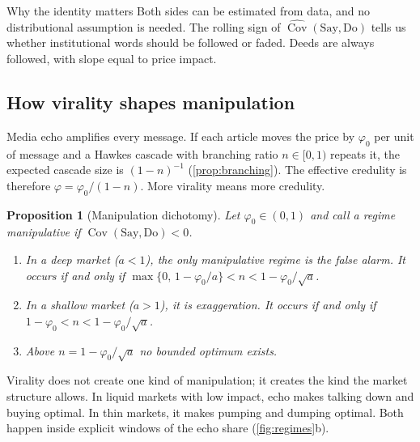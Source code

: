 \documentclass[11pt,a4paper]{article}
\theoremstyle{sci}
\newtheorem{proposition}[theorem]{Proposition}
\theoremstyle{scidef}
\DeclareMathOperator{\Cov}{Cov}
\begin{document}
\begin{keybox}{Why the identity matters}
Both sides can be estimated from data, and no distributional assumption is needed. The rolling sign of $\widehat{\Cov}(\text{Say},\text{Do})$ tells us whether institutional words should be followed or faded. Deeds are always followed, with slope equal to price impact.
\end{keybox}

\subsection{How virality shapes manipulation}

Media echo amplifies every message. If each article moves the price by $\varphi_0$ per unit of message and a Hawkes cascade with branching ratio $n\in[0,1)$ repeats it, the expected cascade size is $(1-n)^{-1}$ (\cref{prop:branching}). The effective credulity is therefore $\varphi=\varphi_0/(1-n)$. More virality means more credulity.

\begin{proposition}[Manipulation dichotomy]\label{prop:virality}
Let $\varphi_0\in(0,1)$ and call a regime \emph{manipulative} if $\Cov(\text{Say},\text{Do})<0$.
\begin{enumerate}[label=(\roman*)]
  \item In a \emph{deep} market ($a<1$), the only manipulative regime is the false alarm. It occurs if and only if $\max\{0,\,1-\varphi_0/a\}<n<1-\varphi_0/\sqrt a$.
  \item In a \emph{shallow} market ($a>1$), it is exaggeration. It occurs if and only if $1-\varphi_0<n<1-\varphi_0/\sqrt a$.
  \item Above $n=1-\varphi_0/\sqrt a$ no bounded optimum exists.
\end{enumerate}
\end{proposition}

\begin{inwords}
Virality does not create one kind of manipulation; it creates the kind the market structure allows. In liquid markets with low impact, echo makes talking down and buying optimal. In thin markets, it makes pumping and dumping optimal. Both happen inside explicit windows of the echo share (\cref{fig:regimes}b).
\end{inwords}
\end{document}
